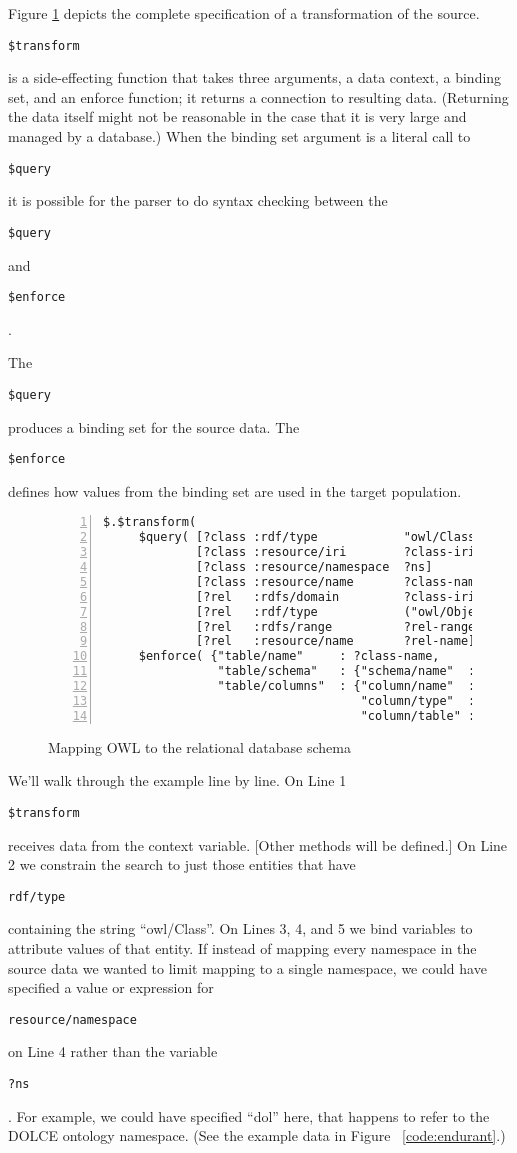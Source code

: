 \documentclass[9pt,letterpaper]{article}
\newcommand{\stt}[1]{\begin{footnotesize}\texttt{#1}\end{footnotesize}}
\begin{document}
Figure \ref{code:mapping-owl-to-rdbms} depicts the complete specification of a transformation of the source.
\stt{\$transform} is a side-effecting function that takes three arguments, a data context, a binding set, and an enforce function;
it returns a connection to resulting data.
(Returning the data itself might not be reasonable in the case that it is very large and managed by a database.)
When the binding set argument is a literal call to \stt{\$query} it is possible for the parser to do syntax checking between
the \stt{\$query} and \stt{\$enforce}.

The \stt{\$query} produces a binding set for the source data.
The \stt{\$enforce} defines how values from the binding set are used in the target population.

\begin{figure}[H]
  \caption{Mapping OWL to the relational database schema}
  \label{code:mapping-owl-to-rdbms}
\begin{lstlisting}[numberstyle=\scriptsize,basicstyle=\ttfamily\scriptsize,numbers=left,stepnumber=1,breaklines=true]
 $.$transform(
     $query( [?class :rdf/type            "owl/Class"]
             [?class :resource/iri        ?class-iri]
             [?class :resource/namespace  ?ns]
             [?class :resource/name       ?class-name]
             [?rel   :rdfs/domain         ?class-iri]
             [?rel   :rdf/type            ("owl/ObjectProperty" or "owl/DataProperty")]
             [?rel   :rdfs/range          ?rel-range]
             [?rel   :resource/name       ?rel-name])
     $enforce( {"table/name"     : ?class-name,
                "table/schema"   : {"schema/name"  : ?ns},
                "table/columns"  : {"column/name"  : ?rel-name,
                                    "column/type"  : ?rel-range,
                                    "column/table" : ?table-ent}} as ?table-ent))
\end{lstlisting}
\end{figure}

We'll walk through the example line by line.
On Line 1 \stt{\$transform} receives data from the context variable. [Other methods will be defined.] %
On Line 2 we constrain the search to just those entities that have \stt{rdf/type} containing the string ``owl/Class''.
On Lines 3, 4, and 5 we bind variables to attribute values of that entity.
If instead of mapping every namespace in the source data we wanted to limit mapping to a single namespace,
we could have specified a value or expression for \stt{resource/namespace} on Line 4 rather than the variable \stt{?ns}.
For example, we could have specified ``dol'' here, that happens to refer to the DOLCE ontology namespace.
(See the example data in Figure ~\ref{code:endurant}.)
\end{document}
